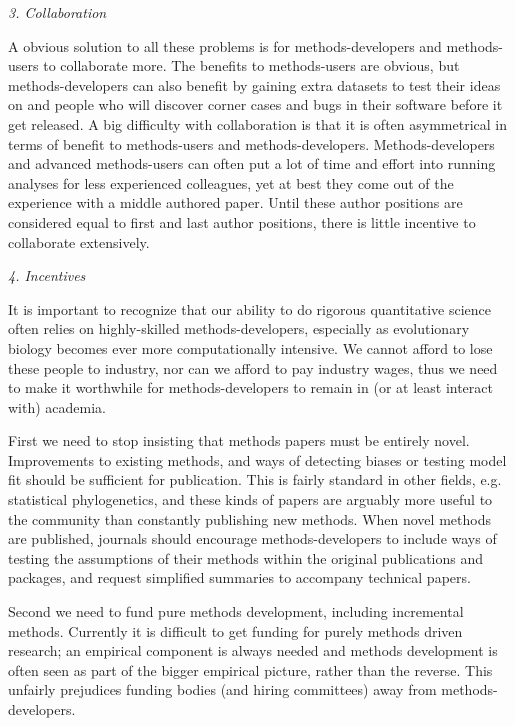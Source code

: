 \documentclass[a4paper,12pt]{article}
\renewcommand{\subsection}[1]{
  \bigskip
  \begin{center}
  \begin{large}
  \normalfont\itshape #1
  \end{large}
  \end{center}
}
\begin{document}
\subsection{3. Collaboration}
A obvious solution to all these problems is for methods-developers and methods-users to collaborate more. 
The benefits to methods-users are obvious, but methods-developers can also benefit by gaining extra datasets to test their ideas on and people who will discover corner cases and bugs in their software before it get released. 
A big difficulty with collaboration is that it is often asymmetrical in terms of benefit to methods-users and methods-developers. 
Methods-developers and advanced methods-users can often put a lot of time and effort into running analyses for less experienced colleagues, yet at best they come out of the experience with a middle authored paper. 
Until these author positions are considered equal to first and last author positions, there is little incentive to collaborate extensively.

\subsection{4. Incentives}
It is important to recognize that our ability to do rigorous quantitative science often relies on highly-skilled methods-developers, especially as evolutionary biology becomes ever more computationally intensive. 
We cannot afford to lose these people to industry, nor can we afford to pay industry wages, thus we need to make it worthwhile for methods-developers to remain in (or at least interact with) academia.

First we need to stop insisting that methods papers must be entirely novel. 
Improvements to existing methods, and ways of detecting biases or testing model fit should be sufficient for publication. 
This is fairly standard in other fields, e.g. statistical phylogenetics, and these kinds of papers are arguably more useful to the community than constantly publishing new methods.
When novel methods are published, journals should encourage methods-developers to include ways of testing the assumptions of their methods within the original publications and packages, and request simplified summaries to accompany technical papers.

Second we need to fund pure methods development, including incremental methods. 
Currently it is difficult to get funding for purely methods driven research; an empirical component is always needed and methods development is often seen as part of the bigger empirical picture, rather than the reverse. 
This unfairly prejudices funding bodies (and hiring committees) away from methods-developers. 
\end{document}

